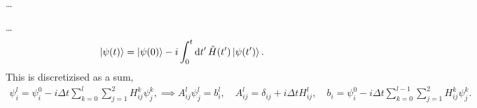 \documentclass{article}
\begin{document}
    \dots
    
    \dots
    \begin{equation*}
        \ket{\psi(t)} = \ket{\psi(0)} - i\int_0^t \dd{t'} \hat H(t')\ket{\psi(t')}.
    \end{equation*}
    This is discretizised as a sum,
    \begin{align*}
        \psi_i^l = \psi_i^0 - i \Delta t \sum_{k=0}^{l} \sum_{j=1}^2 H_{ij}^k \psi_j^k, \implies A_{ij}^l \psi_j^l = b_i^l, \quad A_{ij}^l = \delta_{ij} + i\Delta t H_{ij}^l, \quad b_i = \psi_i^0 - i \Delta t \sum_{k=0}^{l-1} \sum_{j=1}^2 H_{ij}^k \psi_j^k.
    \end{align*}
\end{document}

